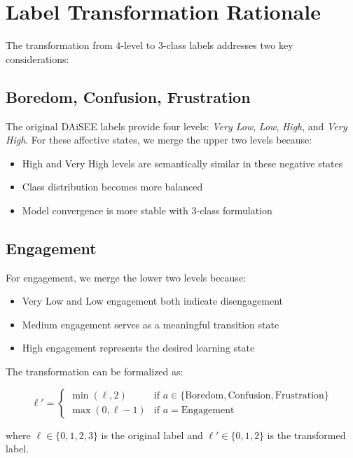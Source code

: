 \documentclass{article}
\begin{document}
\section{Label Transformation Rationale}

The transformation from 4-level to 3-class labels addresses two key considerations:

\subsection*{Boredom, Confusion, Frustration}
The original DAiSEE labels provide four levels: \textit{Very Low}, \textit{Low}, \textit{High}, and \textit{Very High}. For these affective states, we merge the upper two levels because:
\begin{itemize}
    \item High and Very High levels are semantically similar in these negative states
    \item Class distribution becomes more balanced
    \item Model convergence is more stable with 3-class formulation
\end{itemize}

\subsection*{Engagement}
For engagement, we merge the lower two levels because:
\begin{itemize}
    \item Very Low and Low engagement both indicate disengagement
    \item Medium engagement serves as a meaningful transition state
    \item High engagement represents the desired learning state
\end{itemize}

The transformation can be formalized as:

\begin{equation}
\ell' = 
\begin{cases}
\min(\ell, 2) & \text{if } a \in \{\text{Boredom}, \text{Confusion}, \text{Frustration}\} \\
\max(0, \ell - 1) & \text{if } a = \text{Engagement}
\end{cases}
\end{equation}

where $\ell \in \{0, 1, 2, 3\}$ is the original label and $\ell' \in \{0, 1, 2\}$ is the transformed label.
\end{document}
